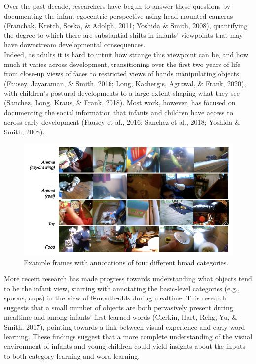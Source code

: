 \documentclass[10pt, letterpaper]{article}
\newenvironment{CodeChunk}{}{}
\begin{document}
Over the past decade, researchers have begun to answer these questions
by documenting the infant egocentric perspective using head-mounted
cameras (Franchak, Kretch, Soska, \& Adolph, 2011; Yoshida \& Smith,
2008), quantifying the degree to which there are substantial shifts in
infants' viewpoints that may have downstream developmental
consequences.\\
Indeed, as adults it is hard to intuit how strange this viewpoint can
be, and how much it varies across development, transitioning over the
first two years of life from close-up views of faces to restricted views
of hands manipulating objects (Fausey, Jayaraman, \& Smith, 2016; Long,
Kachergis, Agrawal, \& Frank, 2020), with children's postural
developments to a large extent shaping what they see (Sanchez, Long,
Kraus, \& Frank, 2018). Most work, however, has focused on documenting
the social information that infants and children have access to across
early development (Fausey et al., 2016; Sanchez et al., 2018; Yoshida \&
Smith, 2008).

\begin{CodeChunk}
\begin{figure}[h]

{\centering \includegraphics{figs/examples-1} 

}

\caption[Example frames with annotations of four different broad categories]{Example frames with annotations of four different broad categories.}\label{fig:examples}
\end{figure}
\end{CodeChunk}

More recent research has made progress towards understanding what
objects tend to be the infant view, starting with annotating the
basic-level categories (e.g., spoons, cups) in the view of 8-month-olds
during mealtime. This research suggests that a small number of objects
are both pervasively present during mealtime and among infants'
first-learned words (Clerkin, Hart, Rehg, Yu, \& Smith, 2017), pointing
towards a link between visual experience and early word learning. These
findings suggest that a more complete understanding of the visual
environment of infants and young children could yield insights about the
inputs to both category learning and word learning.
\end{document}
